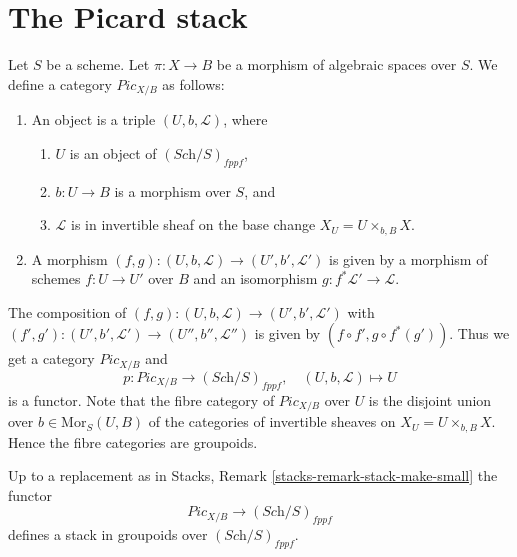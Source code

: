 \section{The Picard stack}
\label{section-picard-stack}

\noindent
Let $S$ be a scheme.
Let $\pi : X \to B$ be a morphism of algebraic spaces over $S$.
We define a category $\textit{Pic}_{X/B}$ as follows:
\begin{enumerate}
\item An object is a triple $(U, b, \mathcal{L})$, where
\begin{enumerate}
\item $U$ is an object of $(\textit{Sch}/S)_{fppf}$,
\item $b : U \to B$ is a morphism over $S$, and
\item $\mathcal{L}$ is in invertible sheaf on the base change
$X_U = U \times_{b, B} X$.
\end{enumerate}
\item A morphism $(f, g) : (U, b, \mathcal{L}) \to (U', b', \mathcal{L}')$
is given by a morphism of schemes $f : U \to U'$ over $B$ and an
isomorphism $g : f^*\mathcal{L}' \to \mathcal{L}$.
\end{enumerate}
The composition of
$(f, g) : (U, b, \mathcal{L}) \to (U', b', \mathcal{L}')$
with
$(f', g') : (U', b', \mathcal{L}') \to (U'', b'', \mathcal{L}'')$
is given by $(f \circ f', g \circ f^*(g'))$.
Thus we get a category $\textit{Pic}_{X/B}$ and
$$
p : \textit{Pic}_{X/B} \longrightarrow (\textit{Sch}/S)_{fppf},
\quad
(U, b, \mathcal{L}) \longmapsto U
$$
is a functor. Note that the fibre category of $\textit{Pic}_{X/B}$ over $U$
is the disjoint union over $b \in \text{Mor}_S(U, B)$ of the categories
of invertible sheaves on $X_U = U \times_{b, B} X$. Hence the fibre
categories are groupoids.

\begin{lemma}
\label{lemma-picard-stack}
Up to a replacement as in
Stacks, Remark \ref{stacks-remark-stack-make-small}
the functor
$$
\textit{Pic}_{X/B} \longrightarrow (\textit{Sch}/S)_{fppf}
$$
defines a stack in groupoids over $(\textit{Sch}/S)_{fppf}$.
\end{lemma}

